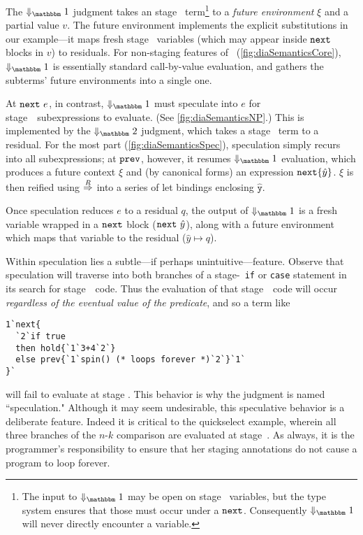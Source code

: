 


The $\redonesym$ judgment takes an stage \bbone\ term\footnote{
The input to $\redonesym$ may be open on stage \bbtwo\ variables,
but the type system ensures that those must occur under a ${\tt next}$.
Consequently $\redonesym$ will never directly encounter a variable.
} to a {\em future environment} $\xi$ and a partial value $v$.  
The future environment implements
the explicit substitutions in our example---it maps fresh stage \bbtwo\
variables (which may appear inside ${\tt next}$ blocks in $v$) to
residuals. For non-staging features of \lang\ (\ref{fig:diaSemanticsCore}),
$\redonesym$ is essentially standard call-by-value evaluation, and gathers the
subterms' future environments into a single one.

At ${\tt next}~e$, in contrast, $\redonesym$ must speculate into $e$ for stage~\bbone\ 
subexpressions to evaluate.  (See \ref{fig:diaSemanticsNP}.)
This is implemented by the $\redtwosym$ judgment, which takes a stage \bbtwo\ term to a residual. 
For the most part (\ref{fig:diaSemanticsSpec}), speculation simply recurs into
all subexpressions; at ${\tt prev}$, however, it resumes $\redonesym$ evaluation,
which produces a future context $\xi$ and (by canonical forms) an expression
${\tt next}\{\hat y\}$. $\xi$ is then reified using $\overset{R}\Rightarrow$ into a series of let
bindings enclosing $\mathtt{\hat y}$.

Once speculation reduces $e$ to a residual $q$, the output of $\redonesym$ is a
fresh variable wrapped in a ${\tt next}$ block (${\tt next}~\hat y$), along with a future
environment which maps that variable to the residual ($\hat y \mapsto q$).

Within speculation lies a subtle---if perhaps unintuitive---feature.  
Observe that speculation will traverse into both branches of a stage-\bbtwo\ {\tt if} or {\tt case} 
statement in its search for stage~\bbone\ code. 
Thus the evaluation of that stage~\bbone\ code will occur {\em regardless of the eventual value of the predicate},
and so a term like 
\begin{lstlisting} 
1`next{
  `2`if true 
  then hold{`1`3+4`2`} 
  else prev{`1`spin() (* loops forever *)`2`}`1`
}`
\end{lstlisting}
will fail to evaluate at stage \bbone.
This behavior is why the judgment is named ``speculation."
Although it may seem undesirable, this speculative behavior is a deliberate feature.
Indeed it is critical to the quickselect example, 
wherein all three branches of the $n$-$k$ comparison are evaluated at stage~\bbone.
As always, it is the programmer's responsibility to ensure that her staging annotations 
do not cause a program to loop forever.  

